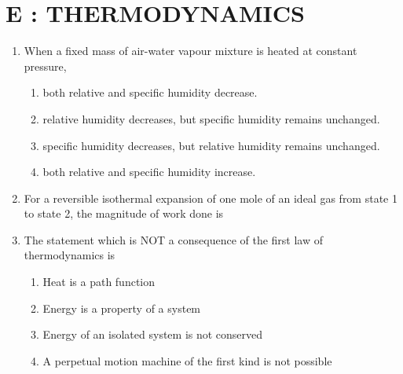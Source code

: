 \documentclass[a4paper,10pt]{article}
\begin{document}
\section*{E : THERMODYNAMICS}
\begin{enumerate}
    \item When a fixed mass of air-water vapour mixture is heated at constant pressure,
    \hfill{}
    \begin{enumerate}[label=\Alph*)]
        \item both relative and specific humidity decrease.
        \item relative humidity decreases, but specific humidity remains unchanged.
        \item specific humidity decreases, but relative humidity remains unchanged.
        \item both relative and specific humidity increase.
    \end{enumerate}

    \item For a reversible isothermal expansion of one mole of an ideal gas from state 1 to state 2, the magnitude of work done is
    \hfill{}
    \begin{enumerate}[label=\Alph*)]
    \end{enumerate}

    \item The statement which is NOT a consequence of the first law of thermodynamics is
    \hfill{}
    \begin{enumerate}[label=\Alph*)]
        \item Heat is a path function
        \item Energy is a property of a system
        \item Energy of an isolated system is not conserved
        \item A perpetual motion machine of the first kind is not possible
    \end{enumerate}


\end{enumerate}
\end{document}
